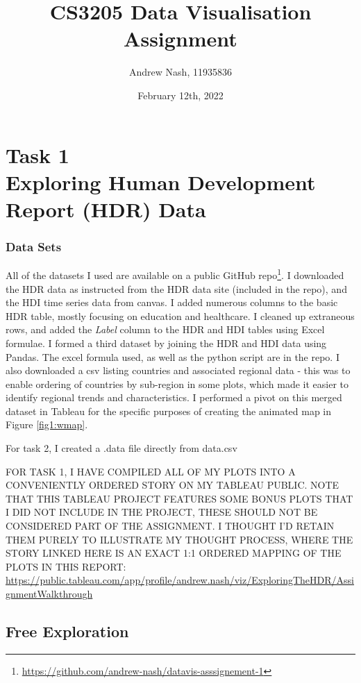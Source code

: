 \documentclass[ 10pt ]{fphw}
\title{CS3205 Data Visualisation Assignment}
\author{Andrew Nash, 11935836}
\date{February 12th, 2022}
\institute{University College Cork \\ BSc Data Science \& Analytics }
\begin{document}
\maketitle 

\section*{Task 1 \\ Exploring Human Development Report (HDR) Data}
\subsubsection*{Data Sets}

All of the datasets I used are available on a public GitHub repo\footnote{\url{https://github.com/andrew-nash/datavis-asssignement-1}}. I downloaded the HDR data as instructed from the HDR data site (included in the repo), and the HDI time series data from canvas. I added numerous columns to the basic HDR table, mostly focusing on education and healthcare. I cleaned up extraneous rows, and added the \emph{Label} column to the HDR and HDI tables using Excel formulae. I formed a third dataset by joining the HDR and HDI data using Pandas. The excel formula used, as well as the python script are in the repo. I also downloaded a csv listing countries and associated regional data - this was to enable ordering of countries by sub-region in some plots, which made it easier to identify regional trends and characteristics. I performed a pivot on this merged dataset in Tableau for the specific purposes of creating the animated map in Figure \ref{fig1:wmap}. 

For task 2, I created a .data file directly from data.csv

\vspace{0.8cm}

FOR TASK 1, I HAVE COMPILED ALL OF MY PLOTS INTO A CONVENIENTLY ORDERED STORY ON MY TABLEAU PUBLIC. NOTE THAT THIS TABLEAU PROJECT FEATURES SOME BONUS PLOTS THAT I DID NOT INCLUDE IN THE PROJECT, THESE SHOULD NOT BE CONSIDERED PART OF THE ASSIGNMENT. I THOUGHT I'D RETAIN THEM PURELY TO ILLUSTRATE MY THOUGHT PROCESS, WHERE THE STORY LINKED HERE IS AN EXACT 1:1 ORDERED MAPPING OF THE PLOTS IN THIS REPORT: \url{https://public.tableau.com/app/profile/andrew.nash/viz/ExploringTheHDR/AssignmentWalkthrough}

\vspace{1cm}

\subsection*{Free Exploration}
\end{document}
